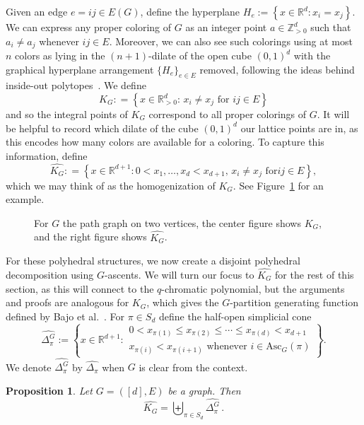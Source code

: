 \documentclass[11pt]{amsart}
\newtheorem{proposition}[theorem]{Proposition}
\newcommand{\asc}{\mathrm{Asc}}
\begin{document}
Given an edge $e = ij \in E(G)$, define the hyperplane $H_e := \left\{ x\in\mathbb{R}^d:x_i = x_j\right\}$. 
We can express any proper coloring of $G$ as an integer point $a \in \mathbb{Z}_{ >0 }^d$ such that $a_i
\neq a_j$ whenever $ij \in E$. 
Moreover, we can also see such colorings using at most $n$ colors as lying in the $(n+1)$-dilate of the open
cube $(0,1)^d$ with the graphical hyperplane arrangement $\{H_e\}_{e \in E}$ removed, following the ideas
behind inside-out polytopes~\cite{iop}.
We define
\[
    K_G : = \left\{x \in \mathbb{R}_{> 0}^{d} : \, x_i \neq x_j \text{ for } ij \in E \right\}
\]
and so the integral points of $K_G$ correspond to all proper colorings of $G$.
It will be helpful to record which dilate of the cube $(0,1)^d$ our lattice points are in, as this encodes how many colors are available for a coloring. 
To capture this information, define
\[
    \widehat{K_G} : = \left\{x \in \mathbb{R}^{d+1} : 0< x_1, \ldots, x_d < x_{d+1}, \, x_i \neq x_j \text{ for
} ij \in E \right\},
\]
which we may think of as the homogenization of $K_G$. %
See Figure~\ref{fig:kgexample} for an example.

\begin{figure}
    \centering
    
    \caption{For $G$ the path graph on two vertices, the center figure shows $K_G$, and the right figure shows $\widehat{K_G}$.}\label{fig:kgexample}
\end{figure}

For these polyhedral structures, we now create a disjoint polyhedral decomposition using $G$-ascents. 
We will turn our focus to $\widehat{K_G}$ for the rest of this section, as this will connect to the $q$-chromatic polynomial, but the arguments and proofs are analogous for $K_G$, which gives the $G$-partition generating function defined by Bajo et al.~\cite{qchromatic}. 
For $\pi \in S_d$ define the half-open simplicial cone
\[
    \widehat{\Delta_\pi^G} := \left\{ x \in \mathbb{R}^{d+1} : 
    \begin{array}{l}
        0 < x_{\pi(1)} \leq x_{\pi(2)} \leq \cdots \leq x_{\pi(d)} < x_{d+1} \\ x_{\pi(i)} < x_{\pi(i+1)} \text{ whenever } i \in \asc_G(\pi)  
    \end{array} \right\}.
\]
We denote $\widehat{\Delta_\pi^G}$ by $\widehat{\Delta_\pi}$ when $G$ is clear from the context. 

\begin{proposition}\label{prop:graphicaldecomposition}
    Let $G = ([d],E)$ be a graph. Then
    \[
        \widehat{K_G} = \biguplus_{\pi \in S_d} \widehat{\Delta_{\pi}^G} \, .
    \]
\end{proposition}
\end{document}
